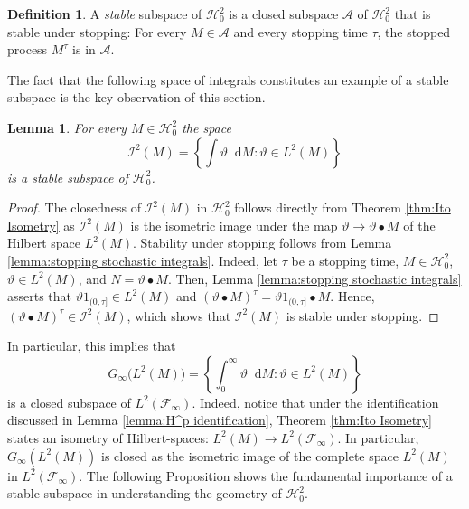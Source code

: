 \documentclass[11pt,a4paper,twoside,openany]{report}
\numberwithin{equation}{section}
\newcommand{\diff}{\mathop{}\!\mathrm{d}}
\theoremstyle{plain} %
\newtheorem{lemma}[theorem]{Lemma}
\theoremstyle{definition} %
\newtheorem{definition}[theorem]{Definition}
\theoremstyle{remark} %
\begin{document}
\begin{definition}\label{def:stable subspace}
    A \textit{stable} subspace of \(\mathcal{H}_0^2\) is a closed subspace \(\mathcal{A}\) of \(\mathcal{H}_0^2\) that is stable under stopping: For every \(M\in\mathcal{A}\) and every stopping time \(\tau\), the stopped process \(M^{\tau}\) is in \(\mathcal{A}\).
\end{definition}
The fact that the following space of integrals constitutes an example of a stable subspace is the key observation of this section.
\begin{lemma}\label{lemma:stochastic integrals as stable subspace}
    For every \(M\in\mathcal{H}_{0}^2\) the space 
    \begin{equation*}
        \mathcal{I}^2(M)=\left\{\int \vartheta\diff M:\vartheta\in L^2(M)\right\}
    \end{equation*}
    is a stable subspace of \(\mathcal{H}_0^2\). 
\end{lemma}
\begin{proof}
    The closedness of \( \mathcal{I}^2(M)\) in \(\mathcal{H}^2_0\) follows directly from Theorem \ref{thm:Ito Isometry} as \( \mathcal{I}^2(M)\) is the isometric image under the map \(\vartheta\to \vartheta\bullet M\) of the Hilbert space \(L^2(M)\). Stability under stopping follows from Lemma \ref{lemma:stopping stochastic integrals}. Indeed, let \(\tau\) be a stopping time, \(M\in\mathcal{H}^2_0\), \(\vartheta\in L^2(M)\), and \(N=\vartheta\bullet M\). Then, Lemma \ref{lemma:stopping stochastic integrals} asserts that \(\vartheta1_{(0,\tau]}\in L^2(M)\) and \((\vartheta\bullet M)^{\tau}=\vartheta1_{(0,\tau]}\bullet M\).  Hence, \((\vartheta\bullet M)^{\tau}\in \mathcal{I}^2(M)\), which shows that \(\mathcal{I}^2(M)\) is stable under stopping. 
\end{proof}
In particular, this implies that  
\begin{equation}\label{eq:closedness of vartheta bullet M_T in L^2}
     G_{\infty}\big(L^2(M)\big)=\left\{\int_0^{\infty} \vartheta\diff M:\vartheta\in L^2(M)\right\}
\end{equation}
is a closed subspace of \(L^2(\mathcal{F}_{\infty})\). Indeed, notice that under the identification discussed in Lemma \ref{lemma:H^p identification},
Theorem \ref{thm:Ito Isometry} states an isometry of Hilbert-spaces: \(L^2(M)\to L^2(\mathcal{F}_{\infty})\). In particular, \(G_{\infty}(L^2(M))\) is closed as the isometric image of the complete space \(L^2(M)\) in \(L^2(\mathcal{F}_{\infty})\). The following Proposition shows the fundamental importance of a stable subspace in understanding the geometry of \(\mathcal{H}_0^2\). 
\end{document}
